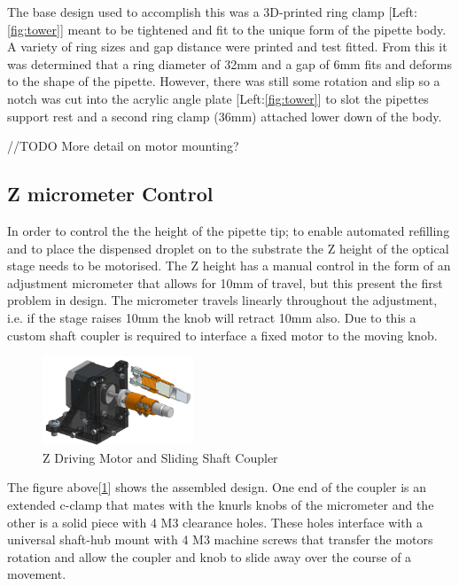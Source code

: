 The base design used to accomplish this was a 3D-printed ring clamp [Left:\ref{fig:tower}] meant to be tightened and fit to the unique form of the pipette body. A variety of ring sizes and gap distance were printed and test fitted. From this it was determined that a ring diameter of 32mm and a gap of 6mm fits and deforms to the shape of the pipette. However, there was still some rotation and slip so a notch was cut into the acrylic angle plate [Left:\ref{fig:tower}] to slot the pipettes support rest and a second ring clamp (36mm) attached lower down of the body.

 //TODO More detail on motor mounting?

\subsection{Z micrometer Control}

In order to control the the height of the pipette tip; to enable automated refilling and to place the dispensed droplet on to the substrate the Z height of the optical stage needs to be motorised. The Z height has a manual control in the form of an adjustment micrometer that allows for 10mm of travel, but this present the first problem in design.
The micrometer travels linearly throughout the adjustment, i.e. if the stage raises 10mm the knob will retract 10mm also. Due to this a custom shaft coupler is required to interface a fixed motor to the moving knob.

\begin{figure}[h]
    \centering
    \includegraphics[width=0.4\textwidth]{img/z_control.png}
    \caption{Z Driving Motor and Sliding Shaft Coupler}
    \label{fig:z_coup}
\end{figure}

The figure above[\ref{fig:z_coup}] shows the assembled design. One end of the coupler is an extended c-clamp that mates with the knurls knobs of the micrometer and the other is a solid piece with 4 M3 clearance holes. These holes interface with a universal shaft-hub mount with 4 M3 machine screws that transfer the motors rotation and allow the coupler and knob to slide away over the course of a movement.

